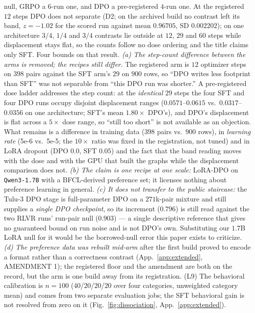 \documentclass{article}
\begin{document}
null, GRPO a $6$-run one, and DPO a pre-registered $4$-run one. At the registered $12$ steps DPO does not separate (D2; on the archived build no contrast left its band, $z=-1.02$ for the scored run against mean $0.96705$, SD $0.002202$); on one architecture $3/4$, $1/4$ and $3/4$ contrasts lie outside at $12$, $29$ and $60$ steps while displacement stays flat, so the counts follow no dose ordering and the title claims only SFT. Four bounds on that result. \emph{(a) The step-count difference between the arms is removed; the recipes still differ.} The registered arm is $12$ optimizer steps on $398$ pairs against the SFT arm's $29$ on $900$ rows, so ``DPO writes less footprint than SFT'' was not separable from ``this DPO run was shorter.'' A pre-registered dose ladder addresses the step count: at the \emph{identical} $29$ steps the four SFT and four DPO runs occupy disjoint displacement ranges ($0.0571$--$0.0615$ vs.\ $0.0317$--$0.0356$ on one architecture; SFT's mean $1.80\times$ DPO's), and DPO's displacement is flat across a $5\times$ dose range, so ``still too short'' is not available as an objection. What remains is a difference in training data ($398$ pairs vs.\ $900$ rows), in \emph{learning rate} (5e-6 vs.\ 5e-5; the $10\times$ ratio was fixed in the registration, not tuned) and in LoRA dropout (DPO $0.0$, SFT $0.05$) and the fact that the band reading moves with the dose and with the GPU that built the graphs while the displacement comparison does not. \emph{(b) The claim is one recipe at one scale:} LoRA-DPO on \texttt{Qwen3-1.7B} with a BFCL-derived preference set; it licenses nothing about preference learning in general. \emph{(c) It does not transfer to the public staircase:} the Tulu-3 DPO stage is full-parameter DPO on a $271$k-pair mixture and still supplies a \emph{single DPO checkpoint}, so its increment ($0.796$) is still read against the two RLVR runs' run-pair null ($0.903$) --- a single descriptive reference that gives no guaranteed bound on run noise and is not DPO's own. Substituting our $1.7$B LoRA null for it would be the borrowed-null error this paper exists to criticize. \emph{(d) The preference data was rebuilt mid-arm} after the first build proved to encode a format rather than a correctness contrast (App.~\ref{app:extended}, AMENDMENT 1); the registered floor and the amendment are both on the record, but the arm is one build away from its registration. (L9) The behavioral calibration is $n{=}100$ ($40$/$20$/$20$/$20$ over four categories, unweighted category mean) and comes from two separate evaluation jobs; the SFT behavioral gain is not resolved from zero on it (Fig.~\ref{fig:dissociation}, App.~\ref{app:extended}).
\end{document}
